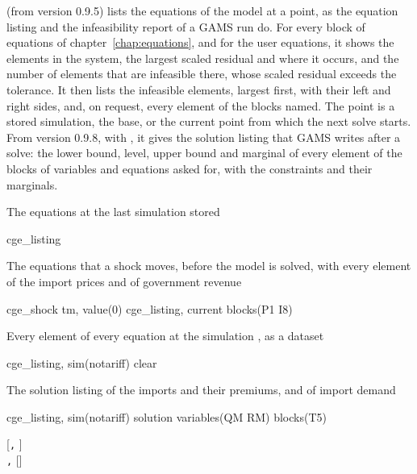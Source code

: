 

 (from version 0.9.5) lists the equations of the model at a
point, as the equation listing and the infeasibility report of a GAMS run do.
For every block of equations of chapter~\ref{chap:equations}, and for the user
equations, it shows the elements in the system, the largest scaled residual and
where it occurs, and the number of elements that are infeasible there, whose
scaled residual exceeds the tolerance. It then lists the infeasible elements,
largest first, with their left and right sides, and, on request, every element
of the blocks named. The point is a stored simulation, the base, or the
current point from which the next solve starts. From version 0.9.8, with
, it gives the solution listing that GAMS writes after a solve:
the lower bound, level, upper bound and marginal of every element of the
blocks of variables and equations asked for, with the constraints and their
marginals.


The equations at the last simulation stored
\begin{stcode}
cge_listing
\end{stcode}
The equations that a shock moves, before the model is solved, with every
element of the import prices and of government revenue
\begin{stcode}
cge_shock tm, value(0)
cge_listing, current blocks(P1 I8)
\end{stcode}
Every element of every equation at the simulation , as a dataset
\begin{stcode}
cge_listing, sim(notariff) clear
\end{stcode}
The solution listing of the imports and their premiums, and of import demand
\begin{stcode}
cge_listing, sim(notariff) solution variables(QM RM) blocks(T5)
\end{stcode}


\begin{stsyntax}
 [\texttt{,} ]\\
 \texttt{,}  []
\end{stsyntax}

